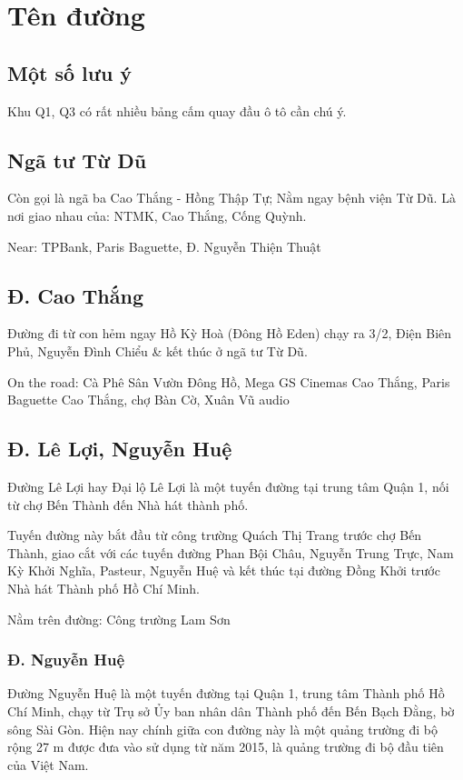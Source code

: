 \chapter{Tên đường}

\section{Một số lưu ý}

Khu Q1, Q3 có rất nhiều bảng cấm quay đầu ô tô cần chú ý.

\section{Ngã tư Từ Dũ}

Còn gọi là ngã ba Cao Thắng - Hồng Thập Tự; Nằm ngay bệnh viện Từ Dũ. Là nơi giao nhau của: NTMK, Cao Thắng, Cống Quỳnh.

Near: TPBank, Paris Baguette, Đ. Nguyễn Thiện Thuật

\section{Đ. Cao Thắng}

Đường đi từ con hẻm ngay Hồ Kỳ Hoà (Đông Hồ Eden) chạy ra 3/2, Điện Biên Phủ, Nguyễn Đình Chiểu \& kết thúc ở ngã tư Từ Dũ.

On the road: Cà Phê Sân Vườn Đông Hồ, Mega GS Cinemas Cao Thắng, Paris Baguette Cao Thắng, chợ Bàn Cờ, Xuân Vũ audio

\section{Đ. Lê Lợi, Nguyễn Huệ}
Đường Lê Lợi hay Đại lộ Lê Lợi là một tuyến đường tại trung tâm Quận 1, nối từ chợ Bến Thành đến Nhà hát thành phố.

Tuyến đường này bắt đầu từ công trường Quách Thị Trang trước chợ Bến Thành, giao cắt với các tuyến đường Phan Bội Châu, Nguyễn Trung Trực, Nam Kỳ Khởi Nghĩa, Pasteur, Nguyễn Huệ và kết thúc tại đường Đồng Khởi trước Nhà hát Thành phố Hồ Chí Minh.

Nằm trên đường: Công trường Lam Sơn

\subsection{Đ. Nguyễn Huệ}

Đường Nguyễn Huệ là một tuyến đường tại Quận 1, trung tâm Thành phố Hồ Chí Minh, chạy từ Trụ sở Ủy ban nhân dân Thành phố đến Bến Bạch Đằng, bờ sông Sài Gòn. Hiện nay chính giữa con đường này là một quảng trường đi bộ rộng 27 m được đưa vào sử dụng từ năm 2015, là quảng trường đi bộ đầu tiên của Việt Nam.

